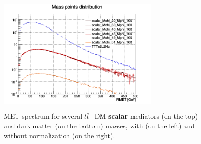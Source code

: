 \documentclass[a4paper, 10pt, openright]{report}
\begin{document}
\begin{figure}[htbp]
{\begin{minipage}[b]{.48\textwidth}
\includegraphics[width=8cm, height=6cm]{figs/scalarMETmChiLarge.png}
\end{minipage} \hfill
}
\caption{\ac{MET} spectrum for several $t \bar t$+DM \textbf{scalar} mediators (on the top) and dark matter (on the bottom) masses, with (on the left) and without normalization (on the right).}
\label{fig:signalScalar}
\end{figure}
\end{document}

